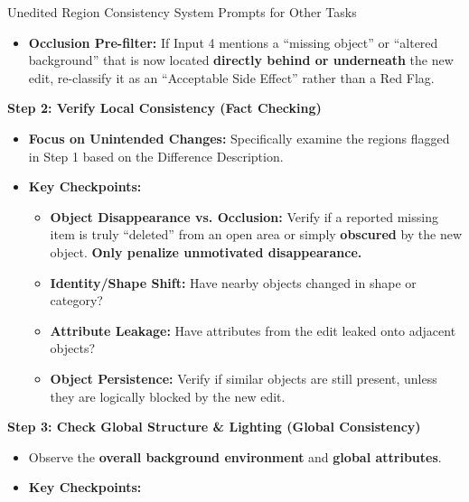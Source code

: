 \begin{promptbox}[label={System Prompts: URC_Other_Tasks}]{Unedited Region Consistency System Prompts for Other Tasks}
\begin{itemize}[leftmargin=2.2em, labelsep=0.5em, itemsep=2pt]
    \item \textbf{Occlusion Pre-filter:} If Input 4 mentions a ``missing object'' or ``altered background'' that is now located \textbf{directly behind or underneath} the new edit, re-classify it as an ``Acceptable Side Effect'' rather than a Red Flag.
\end{itemize}

\medskip

\textbf{Step 2: Verify Local Consistency (Fact Checking)}

\begin{itemize}[leftmargin=2.2em, labelsep=0.5em, itemsep=2pt]
    \item \textbf{Focus on Unintended Changes:} Specifically examine the regions flagged in Step 1 based on the Difference Description.
    
    \item \textbf{Key Checkpoints:}
    
    \begin{itemize}[leftmargin=2.2em, labelsep=0.5em, itemsep=2pt]
        \item \textbf{Object Disappearance vs. Occlusion:} Verify if a reported missing item is truly ``deleted'' from an open area or simply \textbf{obscured} by the new object. \textbf{Only penalize unmotivated disappearance.}
        
        \item \textbf{Identity/Shape Shift:} Have nearby objects changed in shape or category?
        
        \item \textbf{Attribute Leakage:} Have attributes from the edit leaked onto adjacent objects?
        
        \item \textbf{Object Persistence:} Verify if similar objects are still present, unless they are logically blocked by the new edit.
    \end{itemize}
\end{itemize}

\medskip

\textbf{Step 3: Check Global Structure \& Lighting (Global Consistency)}

\begin{itemize}[leftmargin=2.2em, labelsep=0.5em, itemsep=2pt]
    \item Observe the \textbf{overall background environment} and \textbf{global attributes}.
    
    \item \textbf{Key Checkpoints:}
    

\end{itemize}
\end{promptbox}
